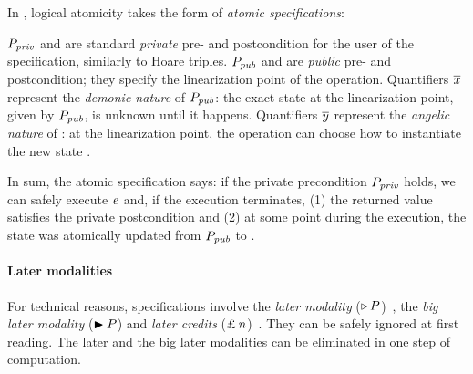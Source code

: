 In \Iris, logical atomicity takes the form of \emph{atomic specifications}:
$\iProp_\v{priv}$ and \iPred are standard \emph{private} pre- and postcondition for the user of the specification, similarly to Hoare triples.
$\iProp_\v{pub}$ and \iPropTwo are \emph{public} pre- and postcondition; they specify the linearization point of the operation.
Quantifiers $\overline{x}$ represent the \emph{demonic nature} of $\iProp_\v{pub}$: the exact state at the linearization point, given by $\iProp_\v{pub}$, is unknown until it happens.
Quantifiers $\overline{y}$ represent the \emph{angelic nature} of \iPropTwo: at the linearization point, the operation can choose how to instantiate the new state \iPropTwo.

In sum, the atomic specification says: if the private precondition $\iProp_\v{priv}$ holds, we can safely execute $\zooExpr$ and, if the execution terminates, (1) the returned value satisfies the private postcondition \iPred and (2) at some point during the execution, the state was atomically updated from $\iProp_\v{pub}$ to \iPropTwo.

\paragraph{Later modalities}

For technical reasons, \Iris specifications involve the \emph{later modality} ($\iLater \iProp$)~\citep{DBLP:journals/jfp/JungKJBBD18}, the \emph{big later modality} ($\iBiglater \iProp$) and \emph{later credits} ($\iCredit{n}$)~\citep{DBLP:journals/pacmpl/SpiesGTJKBD22}.
They can be safely ignored at first reading.
The later and the big later modalities can be eliminated in one step of computation.
